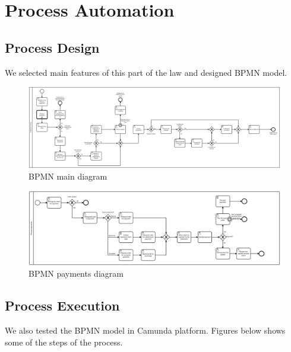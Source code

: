 \chapter{Process Automation}

\section{Process Design}

We selected main features of this part of the law and designed BPMN model.

\begin{landscape}

    \begin{figure}[h]\centering
        \includegraphics[width=22cm]{pic/bpmn}
        \caption{BPMN main diagram}
        \label{fig:bpmnModel}
    \end{figure}
    
    \begin{figure}[h]\centering
        \includegraphics[width=22cm]{pic/bpmn_payments}
        \caption{BPMN payments diagram}
        \label{fig:bpmnPaymentsModel}
    \end{figure}
    
    \end{landscape}
    
    \section{Process Execution}
    
    We also tested the BPMN model in Camunda platform. Figures below shows some of the steps of the process.
    
